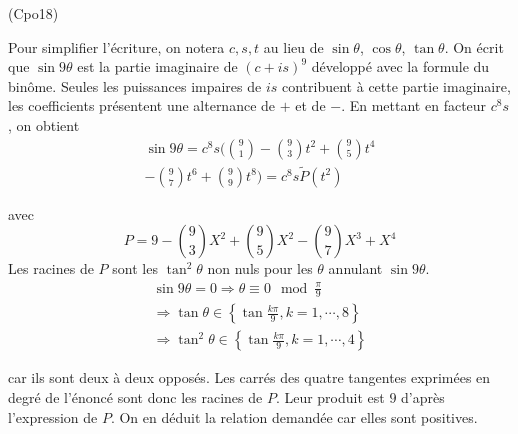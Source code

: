 \begin{tiny}(Cpo18)\end{tiny} Pour simplifier l'écriture, on notera $c, s, t$ au lieu de $\sin \theta$, $\cos \theta$, $\tan \theta$. On écrit que $\sin 9\theta$ est la partie imaginaire de $(c+is)^9$ développé avec la formule du binôme. Seules les puissances impaires de $is$ contribuent à cette partie imaginaire, les coefficients présentent une alternance de $+$ et de $-$. En mettant en facteur $c^8s$, on obtient
\begin{multline*}
 \sin 9\theta =c^8s ( 
\binom{9}{1}-\binom{9}{3}t^2 + \binom{9}{5}t^4\\
 -\binom{9}{7}t^6 + \binom{9}{9}t^8 ) 
= c^8s \widetilde{P}(t^2)
\end{multline*}

avec
\begin{displaymath}
 P= 9-\binom{9}{3}X^2 + \binom{9}{5}X^2 -\binom{9}{7}X^3 + X^4
\end{displaymath}
Les racines de $P$ sont les $\tan^2 \theta$ non nuls pour les $\theta$ annulant $\sin 9\theta$.
\begin{multline*}
 \sin 9\theta =0 \Rightarrow
\theta \equiv  0 \mod \frac{\pi}{9}\\
\Rightarrow \tan \theta \in\left\lbrace \tan \frac{k\pi}{9},k=1,\cdots,8\right\rbrace \\
\Rightarrow \tan^2 \theta \in\left\lbrace \tan \frac{k\pi}{9},k=1,\cdots,4\right\rbrace
\end{multline*}

car ils sont deux à deux opposés. Les carrés des quatre tangentes exprimées en degré de l'énoncé sont donc les racines de $P$. Leur produit est $9$ d'après l'expression de $P$. On en déduit la relation demandée car elles sont positives.
